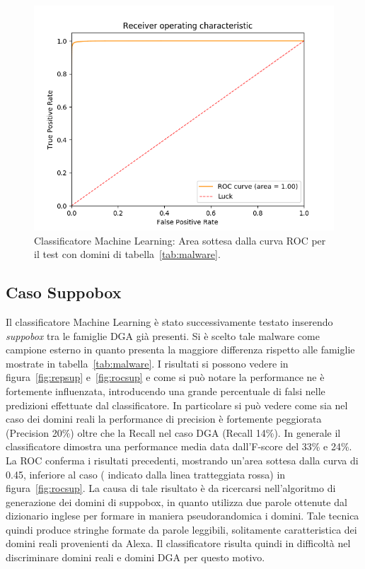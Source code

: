 \begin{figure}[!bp]
    \centering
    \includegraphics[width=\columnwidth]{figures/rndf_tra_nosup_nosup/roc_plot.png}
    \caption{Classificatore Machine Learning: Area sottesa dalla curva ROC per il test con domini di tabella~\ref{tab:malware}.\label{fig:rocdga}}
\end{figure}

\newpage
\subsection{Caso Suppobox}
Il classificatore Machine Learning è stato successivamente testato inserendo \textit{suppobox} tra le famiglie DGA già presenti. Si è scelto tale malware come campione esterno in quanto presenta la maggiore differenza rispetto alle famiglie mostrate in tabella~\ref{tab:malware}. I risultati si possono vedere in figura~\ref{fig:repsup} e~\ref{fig:rocsup} e come si può notare la performance ne è fortemente influenzata, introducendo una grande percentuale di falsi nelle predizioni effettuate dal classificatore. In particolare si può vedere come sia nel caso dei domini reali la performance di precision è fortemente peggiorata (Precision 20\%) oltre che la Recall nel caso DGA (Recall 14\%). In generale il classificatore dimostra una performance media data dall'F-score del 33\% e 24\%. 
La ROC conferma i risultati precedenti, mostrando un'area sottesa dalla curva di 0.45, inferiore al caso ( indicato dalla linea tratteggiata rossa) in figura~\ref{fig:rocsup}. La causa di tale risultato è da ricercarsi nell'algoritmo di generazione dei domini di suppobox, in quanto utilizza due parole ottenute dal dizionario inglese per formare in maniera pseudorandomica i domini. Tale tecnica quindi produce stringhe formate da parole leggibili, solitamente caratteristica dei domini reali provenienti da Alexa. Il classificatore risulta quindi in difficoltà nel discriminare domini reali e domini DGA per questo motivo.

